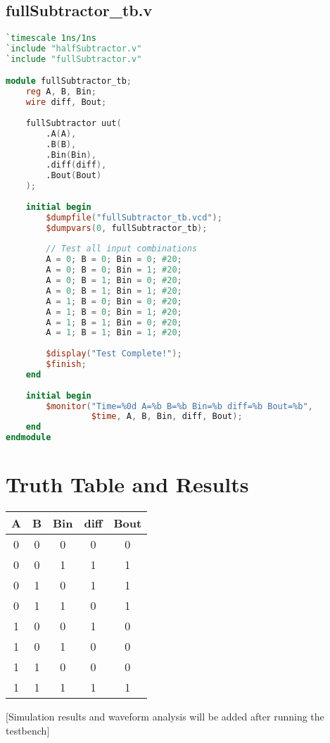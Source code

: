 \documentclass[a4paper,12pt]{article}
\begin{document}
\subsection*{fullSubtractor\_tb.v}
\begin{lstlisting}[language=Verilog]
`timescale 1ns/1ns
`include "halfSubtractor.v"
`include "fullSubtractor.v"

module fullSubtractor_tb;
    reg A, B, Bin;
    wire diff, Bout;
    
    fullSubtractor uut(
        .A(A),
        .B(B),
        .Bin(Bin),
        .diff(diff),
        .Bout(Bout)
    );
    
    initial begin
        $dumpfile("fullSubtractor_tb.vcd");
        $dumpvars(0, fullSubtractor_tb);
        
        // Test all input combinations
        A = 0; B = 0; Bin = 0; #20;
        A = 0; B = 0; Bin = 1; #20;
        A = 0; B = 1; Bin = 0; #20;
        A = 0; B = 1; Bin = 1; #20;
        A = 1; B = 0; Bin = 0; #20;
        A = 1; B = 0; Bin = 1; #20;
        A = 1; B = 1; Bin = 0; #20;
        A = 1; B = 1; Bin = 1; #20;
        
        $display("Test Complete!");
        $finish;
    end
    
    initial begin
        $monitor("Time=%0d A=%b B=%b Bin=%b diff=%b Bout=%b",
                 $time, A, B, Bin, diff, Bout);
    end
endmodule
\end{lstlisting}

\section*{Truth Table and Results}
\begin{center}
\begin{tabular}{|c|c|c||c|c|}
\hline
A & B & Bin & diff & Bout \\
\hline
0 & 0 & 0 & 0 & 0 \\
0 & 0 & 1 & 1 & 1 \\
0 & 1 & 0 & 1 & 1 \\
0 & 1 & 1 & 0 & 1 \\
1 & 0 & 0 & 1 & 0 \\
1 & 0 & 1 & 0 & 0 \\
1 & 1 & 0 & 0 & 0 \\
1 & 1 & 1 & 1 & 1 \\
\hline
\end{tabular}
\end{center}

[Simulation results and waveform analysis will be added after running the testbench]
\end{document}
